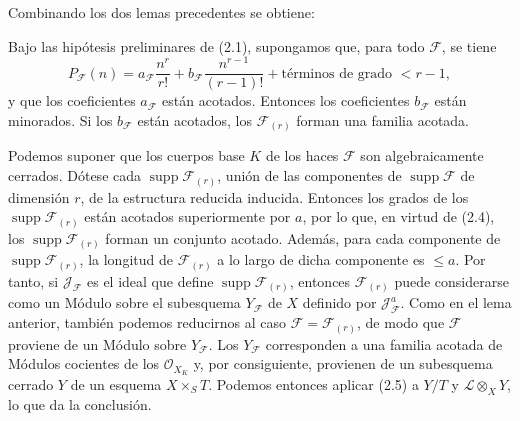Combinando los dos lemas precedentes se obtiene:

 Bajo las hipótesis preliminares de (2.1), supongamos que,
para todo $\mathcal F$, se tiene
\[
P_{\mathcal F}(n)=a_{\mathcal F}\frac{n^r}{r!}
+b_{\mathcal F}\frac{n^{r-1}}{(r-1)!}
+\text{términos de grado $<r-1$},
\]
y que los coeficientes $a_{\mathcal F}$ están acotados. Entonces los
coeficientes $b_{\mathcal F}$ están minorados. Si los $b_{\mathcal F}$ están
acotados, los $\mathcal F_{(r)}$ forman una familia acotada.

Podemos suponer que los cuerpos base $K$ de los haces $\mathcal F$ son
algebraicamente cerrados. Dótese cada
$\operatorname{supp}\mathcal F_{(r)}$, unión de las componentes de
$\operatorname{supp}\mathcal F$ de dimensión $r$, de la estructura reducida
inducida. Entonces los grados de los $\operatorname{supp}\mathcal F_{(r)}$
están acotados superiormente por $a$, por lo que, en virtud de (2.4), los
$\operatorname{supp}\mathcal F_{(r)}$ forman un conjunto acotado. Además, para
cada componente de $\operatorname{supp}\mathcal F_{(r)}$, la longitud de
$\mathcal F_{(r)}$ a lo largo de dicha componente es $\leq a$. Por tanto, si
$\mathcal J_{\mathcal F}$ es el ideal que define
$\operatorname{supp}\mathcal F_{(r)}$, entonces $\mathcal F_{(r)}$
puede considerarse como un Módulo sobre el subesquema $Y_{\mathcal F}$ de $X$
definido por $\mathcal J_{\mathcal F}^{a}$. Como en el lema anterior, también
podemos reducirnos al caso $\mathcal F=\mathcal F_{(r)}$, de modo que
$\mathcal F$ proviene de un Módulo sobre $Y_{\mathcal F}$. Los
$Y_{\mathcal F}$ corresponden a una familia acotada de Módulos cocientes de
los $\mathcal O_{X_K}$ y, por consiguiente, provienen de un subesquema cerrado
$Y$ de un esquema $X\times_S T$. Podemos entonces aplicar (2.5) a $Y/T$ y
$\mathcal L\otimes_XY$, lo que da la conclusión.

